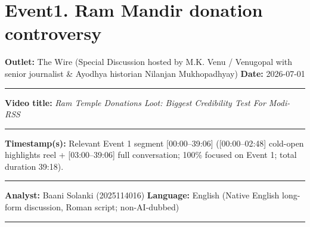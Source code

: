 \documentclass[10pt,a4paper]{article}
\newcommand{\formrule}{\par\vspace{3pt}\noindent\rule{\textwidth}{0.35pt}\par\vspace{7pt}}
\newcommand{\sectionrule}{\par\vspace{4pt}\noindent\rule{\textwidth}{0.4pt}\par\vspace{8pt}}
\begin{document}
\vspace{4pt}

\newpage


\section*{Event1. Ram Mandir donation controversy}
\par\vspace{6pt}
\noindent\textbf{Outlet:} The Wire (Special Discussion hosted by M.K. Venu / Venugopal with senior journalist \& Ayodhya historian Nilanjan Mukhopadhyay) \hfill \textbf{Date:} 2026-07-01
\formrule
\noindent\textbf{Video title:} \emph{Ram Temple Donations Loot: Biggest Credibility Test For Modi-RSS}
\formrule
\noindent\textbf{Timestamp(s):} Relevant Event 1 segment [00:00--39:06] ([00:00--02:48] cold-open highlights reel + [03:00--39:06] full conversation; 100\% focused on Event 1; total duration 39:18).
\formrule
\noindent\textbf{Analyst:} Baani Solanki (2025114016) \hfill \textbf{Language:} English (Native English long-form discussion, Roman script; non-AI-dubbed)
\sectionrule
\end{document}
